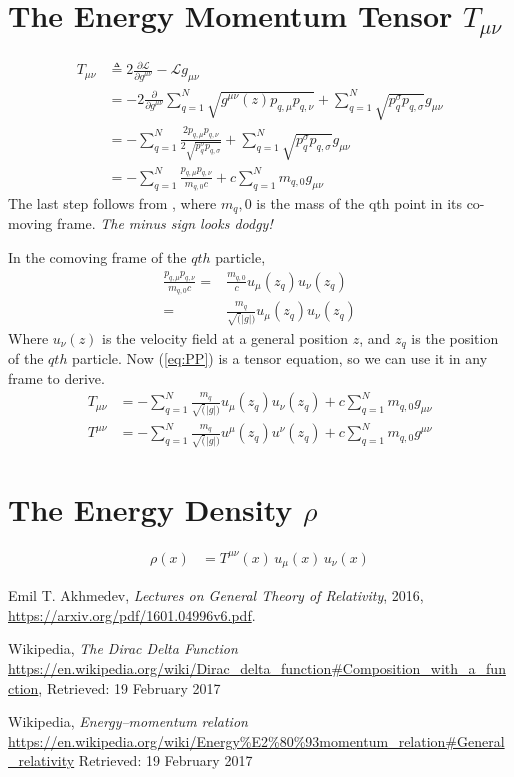 \documentclass[]{article}
\newcommand{\Lagr}{\mathscr{L}}
\begin{document}
\section{The Energy Momentum Tensor $T_{\mu\nu}$}

\begin{align}
T_{\mu\nu}&\triangleq 2 \frac{\partial \Lagr}{\partial g^{\mu\nu}} - \Lagr g_{\mu\nu} \label{eq:T}\\
&= -2 \frac{\partial }{\partial g^{\mu\nu}}\sum_{q=1}^N \sqrt{g^{\mu\nu}(z) p_{q,\mu} p_{q,\nu}}+\sum_{q=1}^N \sqrt{ p^{\sigma}_q p_{q,\sigma}} g_{\mu\nu} \\
&= - \sum_{q=1}^N \frac{2 p_{q,\mu} p_{q,\nu}}{2 \sqrt{ p^{\sigma}_q p_{q,\sigma}} }  +\sum_{q=1}^N \sqrt{ p^{\sigma}_q p_{q,\sigma}} g_{\mu\nu} \\
&= - \sum_{q=1}^N \frac{p_{q,\mu} p_{q,\nu}}{ m_{q,0} c }  +c\sum_{q=1}^N   m_{q,0} g_{\mu\nu} 
\end{align}
The last step follows from \cite{wiki_momentum}, where $m_q,0$ is the mass of the qth point in its co-moving frame. \emph{The minus sign looks dodgy!}


In the comoving frame of the $qth$ particle,
\begin{align}
\frac{p_{q,\mu} p_{q,\nu}}{ m_{q,0} c } =& \frac{m_{q,0}}{c}  u_{\mu}(z_q) u_{\nu}(z_q)\\
=& \frac{m_{q}}{\sqrt(|g|)}  u_{\mu}(z_q) u_{\nu}(z_q) \label{eq:PP}
\end{align}
Where $u_{\nu}(z)$ is the velocity field at a general position $z$, and $z_q$ is the position of the $qth$ particle. Now (\ref{eq:PP}) is a tensor equation, so we can use it in any frame to derive.
\begin{align}
T_{\mu\nu} &= - \sum_{q=1}^N  \frac{m_{q}}{\sqrt(|g|)}  u_{\mu}(z_q) u_{\nu}(z_q)  +c\sum_{q=1}^N   m_{q,0} g_{\mu\nu}\\
T^{\mu\nu} &= - \sum_{q=1}^N  \frac{m_{q}}{\sqrt(|g|)}  u^{\mu}(z_q) u^{\nu}(z_q)  +c\sum_{q=1}^N   m_{q,0} g^{\mu\nu}
\end{align}
\section{The Energy Density $\rho$}

\begin{align}
\rho(x) &= T^{\mu\nu}(x) \, u_\mu(x) \, u_\nu(x)
\end{align}
\begin{thebibliography}{9}
	
	Emil T. Akhmedev,
	\emph{Lectures on General Theory of Relativity},
	2016,
	\url{https://arxiv.org/pdf/1601.04996v6.pdf}.
	
	Wikipedia,
	\emph{The Dirac Delta Function}
	\url{https://en.wikipedia.org/wiki/Dirac_delta_function#Composition_with_a_function},
	Retrieved: 19 February 2017
	
	Wikipedia,
	\emph{Energy–momentum relation}
	\url{https://en.wikipedia.org/wiki/Energy%E2%80%93momentum_relation#General_relativity}
		Retrieved: 19 February 2017
\end{thebibliography}
\end{document}
